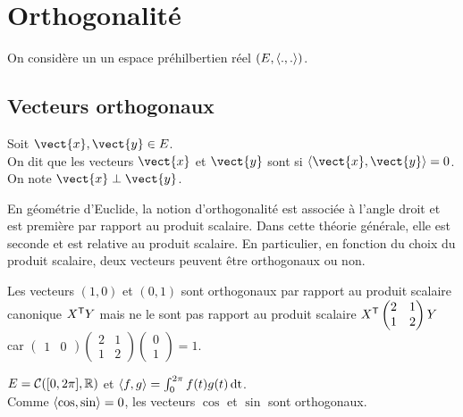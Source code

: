 \documentclass{book}
\begin{document}
\section{Orthogonalité}
On considère un un espace préhilbertien réel $(E,\langle.,.\rangle)$.

%
\subsection{Vecteurs orthogonaux}

\begin{Definition}
Soit $\vect{x},\vect{y}\in E$.\\
On dit que les vecteurs $\vect{x}$ et $\vect{y}$ sont  si $\PS{\vect{x}}{\vect{y}} = 0$.\\
On note $\vect{x} \perp \vect{y}$.
\end{Definition}
En géométrie d'Euclide, la notion d'orthogonalité est associée  à l'angle droit et est première par rapport au produit scalaire. Dans cette théorie générale, elle est seconde et est relative au produit scalaire. En particulier, en fonction du choix du produit scalaire, deux vecteurs peuvent être orthogonaux ou non.
\begin{Exemple}
Les vecteurs $(1,0)$ et $(0,1)$ sont orthogonaux par rapport au produit scalaire canonique $X^{\mathsf {T}}Y$  mais ne le sont pas rapport au produit scalaire $X^{\mathsf {T}}\begin{pmatrix}
2&1 \\1&2
\end{pmatrix}Y$ car $\begin{pmatrix}
1 &0
\end{pmatrix}\begin{pmatrix}
2&1 \\1&2
\end{pmatrix}\begin{pmatrix}
0 \\1
\end{pmatrix}=1$.
\end{Exemple}
\begin{Exemple}
$E=\mathcal{C}([0,2\pi],\mathbb{R} )$ et $\langle f,g\rangle= \int_0^{2\pi} f(t)g(t)\,\mathrm{dt} $.\\
Comme $\langle\cos,\sin\rangle=0$, les vecteurs $\cos$ et $\sin$ sont orthogonaux. 
\end{Exemple}   
\end{document}
